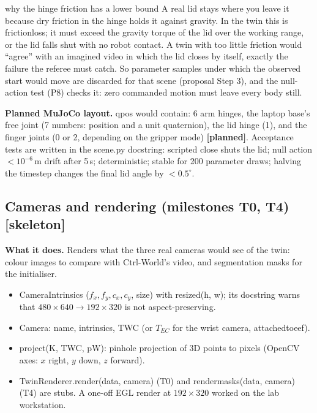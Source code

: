 \documentclass[11pt,a4paper]{article}
\newcommand{\skel}{\textcolor{skelamber}{\textbf{[skeleton]}}}
\newcommand{\planned}{\textcolor{plangray}{\textbf{[planned]}}}
\newcommand{\code}[1]{{\small\ttfamily\begingroup\def\_{\textunderscore\allowbreak}\def\/{/\allowbreak}#1\endgroup}}
\begin{document}
\begin{newc}{why the hinge friction has a lower bound}
A real lid stays where you leave it because dry friction in the hinge holds it against gravity. In the twin this is \code{frictionloss}; it must exceed the gravity torque of the lid over the working range, or the lid falls shut with no robot contact. A twin with too little friction would ``agree'' with an imagined video in which the lid closes by itself, exactly the failure the referee must catch. So parameter samples under which the observed start would move are discarded for that scene (proposal Step 3), and the null-action test (P8) checks it: zero commanded motion must leave every body still.
\end{newc}

\textbf{Planned MuJoCo layout.} \code{qpos} would contain: 6 arm hinges, the laptop base's free joint (7 numbers: position and a unit quaternion), the lid hinge (1), and the finger joints (0 or 2, depending on the gripper mode) \planned. Acceptance tests are written in the \code{scene.py} docstring: scripted close shuts the lid; null action $<10^{-6}$\,m drift after 5\,s; deterministic; stable for 200 parameter draws; halving the timestep changes the final lid angle by $<0.5^\circ$.

\subsection{Cameras and rendering (milestones T0, T4) \skel}\label{sec:render}
\textbf{What it does.} Renders what the three real cameras would see of the twin: colour images to compare with Ctrl-World's video, and segmentation masks for the initialiser.

\begin{incode}[: \code{src/twin/cameras.py}, \code{src/twin/render.py}]
\begin{itemize}[leftmargin=*]
\item \code{CameraIntrinsics} ($f_x,f_y,c_x,c_y$, size) with \code{resized(h, w)}; its docstring warns that $480\times640\to192\times320$ is not aspect-preserving.
\item \code{Camera}: name, intrinsics, \code{T\_WC} (or $T_{EC}$ for the wrist camera, \code{attached\_to\_eef}).
\item \code{project(K, T\_WC, p\_W)}: pinhole projection of 3D points to pixels (OpenCV axes: $x$ right, $y$ down, $z$ forward).
\item \code{TwinRenderer.render(data, camera)} (T0) and \code{render\_masks(data, camera)} (T4) are stubs. A one-off EGL render at $192\times320$ worked on the lab workstation.
\end{itemize}
\end{incode}
\end{document}
